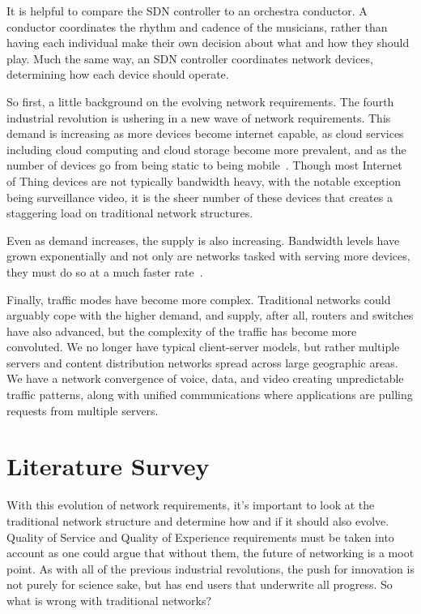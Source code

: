 \documentclass[11pt]{article}
\begin{document}
It is helpful to compare the SDN controller to an orchestra conductor. A conductor coordinates the rhythm and cadence of the musicians, rather than having each individual make their own decision about what and how they should play. Much the same way, an SDN controller coordinates network devices, determining how each device should operate.

So first, a little background on the evolving network requirements. The fourth industrial revolution is ushering in a new wave of network requirements. This demand is increasing as more devices become internet capable, as cloud services including cloud computing and cloud storage become more prevalent, and as the number of devices go from being static to being mobile~\cite{Sandberg}. Though most Internet of Thing devices are not typically bandwidth heavy, with the notable exception being surveillance video, it is the sheer number of these devices that creates a staggering load on traditional network structures.

Even as demand increases, the supply is also increasing. Bandwidth levels have grown exponentially and not only are networks tasked with serving more devices, they must do so at a much faster rate~\cite{ONF}.

Finally, traffic modes have become more complex. Traditional networks could arguably cope with the higher demand, and supply, after all, routers and switches have also advanced, but the complexity of the traffic has become more convoluted. We no longer have typical client-server models, but rather multiple servers and content distribution networks spread across large geographic areas. We have a network convergence of voice, data, and video creating unpredictable traffic patterns, along with unified communications where applications are pulling requests from multiple servers.

\section{Literature Survey}

With this evolution of network requirements, it’s important to look at the traditional network structure and determine how and if it should also evolve. Quality of Service and Quality of Experience requirements must be taken into account as one could argue that without them, the future of networking is a moot point. As with all of the previous industrial revolutions, the push for innovation is not purely for science sake, but has end users that underwrite all progress. So what is wrong with traditional networks?
\end{document}
